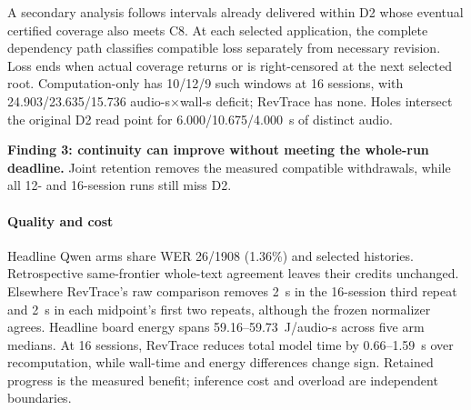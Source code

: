 A secondary analysis follows intervals already delivered within D2 whose
eventual certified coverage also meets C8. At each selected application,
the complete dependency path classifies compatible loss separately from
necessary revision. Loss ends when actual coverage returns or is
right-censored at the next selected root. Computation-only has 10/12/9
such windows at 16 sessions, with 24.903/23.635/15.736 audio-s$\times$wall-s
deficit; RevTrace has none. Holes intersect the original D2 read point
for 6.000/10.675/4.000~s of distinct audio.
\par\noindent\textbf{Finding 3: continuity can improve without meeting the whole-run deadline.}
Joint retention removes the measured compatible withdrawals, while all
12- and 16-session runs still miss D2.

\paragraph{Quality and cost}
Headline Qwen arms share WER 26/1908 (1.36\%) and selected histories.
Retrospective same-frontier whole-text agreement leaves their credits
unchanged. Elsewhere RevTrace's raw comparison removes 2~s in the 16-session third
repeat and 2~s in each midpoint's first two repeats, although the frozen
normalizer agrees. Headline board
energy spans 59.16--59.73~J/audio-s across five arm medians. At 16 sessions, RevTrace reduces total
model time by 0.66--1.59~s over recomputation, while wall-time and energy
differences change sign. Retained progress is the measured benefit;
inference cost and overload are independent boundaries.
